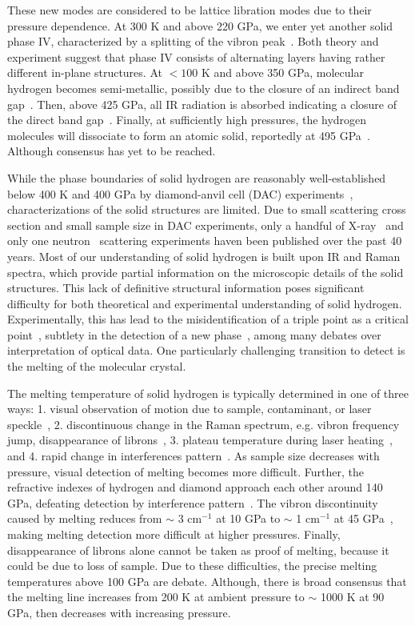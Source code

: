 These new modes are considered to be lattice libration modes due to their pressure dependence.
At 300 K and above 220 GPa, we enter yet another solid phase IV, characterized by a splitting of the vibron peak~\cite{Zha2013}.
Both theory and experiment suggest that phase IV consists of alternating layers having rather different in-plane structures.
At $<100$ K and above 350 GPa, molecular hydrogen becomes semi-metallic, possibly due to the closure of an indirect band gap~\cite{Eremets2019}.
Then, above 425 GPa, all IR radiation is absorbed indicating a closure of the direct band gap~\cite{Loubeyre2020}.
Finally, at sufficiently high pressures, the hydrogen molecules will dissociate to form an atomic solid, reportedly at 495 GPa~\cite{Silvera2017}. Although consensus has yet to be reached.

While the phase boundaries of solid hydrogen are reasonably well-established below 400 K and 400 GPa by diamond-anvil cell (DAC) experiments~\cite{Dias2019}, characterizations of the solid structures are limited. Due to small scattering cross section and small sample size in DAC experiments, only a handful of X-ray~\cite{Hazen1987,MAO1988,Loubeyre1996,Kawamura2002,Goncharenko2005a,Akahama2010,Ji2019} and only one neutron~\cite{Goncharenko2005a} scattering experiments haven been published over the past 40 years. Most of our understanding of solid hydrogen is built upon IR and Raman spectra, which provide partial information on the microscopic details of the solid structures. This lack of definitive structural information poses significant difficulty for both theoretical and experimental understanding of solid hydrogen. Experimentally, this has lead to the misidentification of a triple point as a critical point~\cite{Lorenzana1990,Cui1994}, subtlety in the detection of a new phase~\cite{Eremets2009,Howie2012}, among many debates over interpretation of optical data. One particularly challenging transition to detect is the melting of the molecular crystal.

The melting temperature of solid hydrogen is typically determined in one of three ways: 1. visual observation of motion due to sample, contaminant, or laser speckle~\cite{Gregoryanz2003}, 2. discontinuous change in the Raman spectrum, e.g. vibron frequency jump, disappearance of librons~\cite{Gregoryanz2003,Subramanian2011,Zha2017}, 3. plateau temperature during laser heating~\cite{Deemyad2008}, and 4. rapid change in interferences pattern~\cite{Eremets2009}.
As sample size decreases with pressure, visual detection of melting becomes more difficult. Further, the refractive indexes of hydrogen and diamond approach each other around 140 GPa, defeating detection by interference pattern~\cite{Zha2017}.
The vibron discontinuity caused by melting reduces from $\sim$ 3 cm$^{-1}$ at 10 GPa to $\sim$ 1 cm$^{-1}$ at 45 GPa~\cite{Gregoryanz2003}, making melting detection more difficult at higher pressures.
Finally, disappearance of librons alone cannot be taken as proof of melting, because it could be due to loss of sample.
Due to these difficulties, the precise melting temperatures above 100 GPa are debate. Although, there is broad consensus that the melting line increases from 200 K at ambient pressure to $\sim$ 1000 K at 90 GPa, then decreases with increasing pressure.

